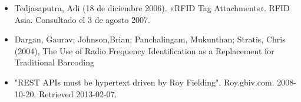 \documentclass[11pt,twocolumn]{article}
\begin{document}
	\begin{itemize}
		\item  Tedjasaputra, Adi (18 de diciembre 2006). «RFID Tag Attachments». RFID Asia. Consultado el 3 de agosto 2007.
		\item Dargan, Gaurav; Johnson,Brian; Panchalingam, Mukunthan; Stratis, Chris (2004), The Use of Radio Frequency Identification as a Replacement for Traditional Barcoding
		
		\item "REST APIs must be hypertext driven by Roy Fielding". Roy.gbiv.com. 2008-10-20. Retrieved 2013-02-07.
	\end{itemize}
	
\end{document}
